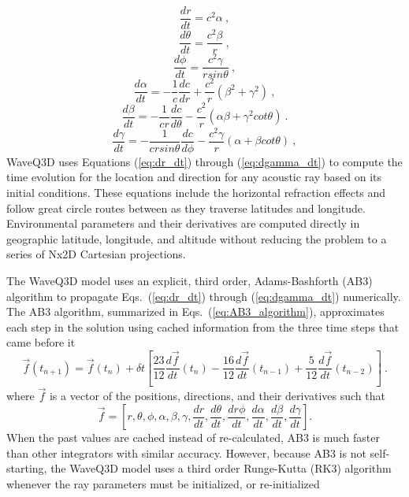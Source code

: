 \documentclass{ws-jca}
\newcommand{\twoDxN}{Nx2\nobreakdash\textendash D }
\begin{document}
\begin{equation}
	\frac{dr}{dt} = c^2 \alpha \:,
	\label{eq:dr_dt}
\end{equation}
\begin{equation}
	\frac{d\theta}{dt} = \frac{c^2 \beta}{r} \:,
	\label{eq:dtheta_dt}
\end{equation}
\begin{equation}
	\frac{d\phi}{dt} = \frac{c^2\gamma}{r sin\theta} \:,
	\label{eq:dphi_dt}
\end{equation}
\begin{equation}
	\frac{d\alpha}{dt} = -\frac{1}{c}\frac{dc}{dr} 
		+ \frac{c^2}{r}\left( \beta^2 + \gamma^2 \right) \:,
	\label{eq:dalpha_dt}
\end{equation}
\begin{equation}
	\frac{d\beta}{dt} = -\frac{1}{cr}\frac{dc}{d\theta} 
		- \frac{c^2}{r} \left( \alpha \beta + \gamma^2 cot\theta \right) \:.
	\label{eq:dbeta_dt}
\end{equation}
\begin{equation}
	\frac{d\gamma}{dt} = -\frac{1}{cr sin\theta}\frac{dc}{d\phi} 
		- \frac{c^2 \gamma}{r} \left( \alpha + \beta cot\theta \right) \:,
	\label{eq:dgamma_dt}
\end{equation}
WaveQ3D uses Equations (\ref{eq:dr_dt}) through (\ref{eq:dgamma_dt}) to compute the time evolution for the location and direction for any acoustic ray based on its initial conditions. These equations include the horizontal refraction effects and follow great circle routes between
as they traverse latitudes and longitude. Environmental parameters and their derivatives are computed directly in geographic latitude, longitude, and altitude without reducing the problem to a series of \twoDxN Cartesian projections.

The WaveQ3D model uses an explicit, third order, Adams-Bashforth (AB3) algorithm\cite{Yakowitz1986} to propagate Eqs.~(\ref{eq:dr_dt}) through (\ref{eq:dgamma_dt}) numerically. The AB3 algorithm, summarized in Eqs.~(\ref{eq:AB3_algorithm}), approximates each step in the solution using cached information from the three time steps that came before it
\begin{equation}
	\vec{f}(t_{n+1}) = \vec{f} (t_{n}) + \delta t \left[ 
		\frac{23}{12} \frac{d\vec{f}}{dt}(t_n)
	  	- \frac{16}{12} \frac{d\vec{f}}{dt}(t_{n-1}) 
	  	+ \frac{5}{12} \frac{d\vec{f}}{dt}(t_{n-2}) \right] \:.
	\label{eq:AB3_algorithm}
\end{equation}
where $\vec{f}$ is a vector of the positions, directions, and their derivatives such that
\begin{equation}
	\vec{f} = \left[ r, \theta, \phi, \alpha, \beta, \gamma, \frac{dr}{dt}, \frac{d\theta}{dt}, \frac{dr\phi}{dt}, 
		\frac{d\alpha}{dt}, \frac{d\beta}{dt}, \frac{d\gamma}{dt} \right] .
\end{equation}
When the past values are cached instead of re-calculated, AB3 is much faster
than other integrators with similar accuracy. However, because AB3 is not self-starting,
the WaveQ3D model uses a third order Runge-Kutta (RK3) algorithm\cite{Press1992}
whenever the ray parameters must be initialized, or re-initialized
\end{document}
